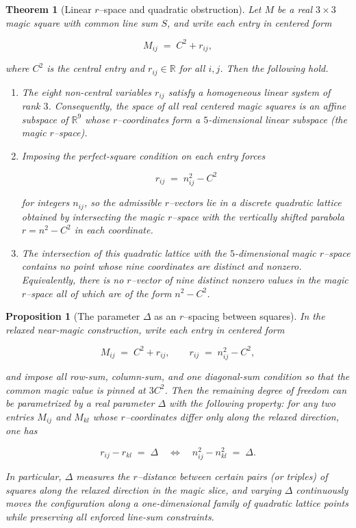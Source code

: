 \documentclass[12pt]{article}
\newtheorem{theorem}{Theorem}
\newtheorem{proposition}{Proposition}
\begin{document}
\begin{theorem}[Linear $r$--space and quadratic obstruction]
Let $M$ be a real $3\times 3$ magic square with common line sum $S$, and write
each entry in centered form


\[
M_{ij} \;=\; C^2 + r_{ij},
\]


where $C^2$ is the central entry and $r_{ij}\in\mathbb{R}$ for all $i,j$.
Then the following hold.

\begin{enumerate}
  \item The eight non-central variables $r_{ij}$ satisfy a homogeneous linear
  system of rank $3$.  Consequently, the space of all real centered magic
  squares is an affine subspace of $\mathbb{R}^9$ whose $r$--coordinates form a
  $5$-dimensional linear subspace (the \emph{magic $r$--space}).

  \item Imposing the perfect-square condition on each entry forces
  

\[
    r_{ij} \;=\; n_{ij}^2 - C^2
  \]


  for integers $n_{ij}$, so the admissible $r$--vectors lie in a discrete
  quadratic lattice obtained by intersecting the magic $r$--space with the
  vertically shifted parabola $r = n^2 - C^2$ in each coordinate.

  \item The intersection of this quadratic lattice with the $5$-dimensional
  magic $r$--space contains no point whose nine coordinates are distinct and
  nonzero.  Equivalently, there is no $r$--vector of nine distinct nonzero
  values in the magic $r$--space all of which are of the form $n^2 - C^2$.
\end{enumerate}
\end{theorem}

\begin{proposition}[The parameter $\Delta$ as an $r$--spacing between squares]
In the relaxed near-magic construction, write each entry in centered form


\[
M_{ij} \;=\; C^2 + r_{ij}, \qquad r_{ij} \;=\; n_{ij}^2 - C^2,
\]


and impose all row-sum, column-sum, and one diagonal-sum condition so that the
common magic value is pinned at $3C^2$.  Then the remaining degree of freedom
can be parametrized by a real parameter $\Delta$ with the following property:
for any two entries $M_{ij}$ and $M_{kl}$ whose $r$--coordinates differ only
along the relaxed direction, one has


\[
r_{ij} - r_{kl} \;=\; \Delta
\quad\Longleftrightarrow\quad
n_{ij}^2 - n_{kl}^2 \;=\; \Delta.
\]


In particular, $\Delta$ measures the $r$--distance between certain pairs (or
triples) of squares along the relaxed direction in the magic slice, and
varying $\Delta$ continuously moves the configuration along a one-dimensional
family of quadratic lattice points while preserving all enforced line-sum
constraints.
\end{proposition}
\end{document}
